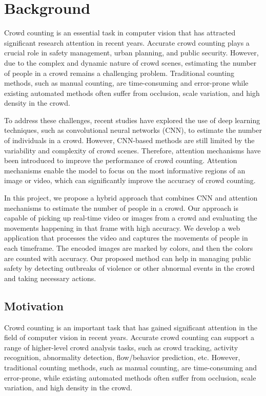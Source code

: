 \documentclass[12pt]{report}
\begin{document}
\section{Background}

Crowd counting is an essential task in computer vision that has attracted significant research attention in recent years. Accurate crowd counting plays a crucial role in safety management, urban planning, and public security. However, due to the complex and dynamic nature of crowd scenes, estimating the number of people in a crowd remains a challenging problem. Traditional counting methods, such as manual counting, are time-consuming and error-prone while existing automated methods often suffer from occlusion, scale variation, and high density in the crowd.
\newline

To address these challenges, recent studies have explored the use of deep learning techniques, such as convolutional neural networks (CNN), to estimate the number of individuals in a crowd. However, CNN-based methods are still limited by the variability and complexity of crowd scenes. Therefore, attention mechanisms have been introduced to improve the performance of crowd counting. Attention mechanisms enable the model to focus on the most informative regions of an image or video, which can significantly improve the accuracy of crowd counting.
\newline

In this project, we propose a hybrid approach that combines CNN and attention mechanisms to estimate the number of people in a crowd. Our approach is capable of picking up real-time video or images from a crowd and evaluating the movements happening in that frame with high accuracy. We develop a web application that processes the video and captures the movements of people in each timeframe. The encoded images are marked by colors, and then the colors are counted with accuracy. Our proposed method can help in managing public safety by detecting outbreaks of violence or other abnormal events in the crowd and taking necessary actions.
\newline




\subsection{Motivation}

Crowd counting is an important task that has gained significant attention in the field of computer vision in recent years. Accurate crowd counting can support a range of higher-level crowd analysis tasks, such as crowd tracking, activity recognition, abnormality detection, flow/behavior prediction, etc. However, traditional counting methods, such as manual counting, are time-consuming and error-prone, while existing automated methods often suffer from occlusion, scale variation, and high density in the crowd.
\newline
\end{document}
